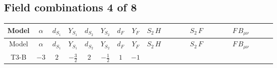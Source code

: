 \documentclass[8pt]{article}
\begin{document}
\begin{landscape}
\subsection*{Field combinations 4 of 8}
\begin{longtable}{@{}cccccccc >{\raggedright\arraybackslash}p{0.21\linewidth} >{\raggedright\arraybackslash}p{0.21\linewidth} >{\raggedright\arraybackslash}p{0.21\linewidth}@{}}
\toprule
Model & $\alpha$ & $d_{S_1}$ & $Y_{S_1}$ & $d_{S_2}$ & $Y_{S_2}$ & $d_F$ & $Y_F$ & $S_2\,H$ & $S_2\,F$ & $F\,B_{\mu\nu}$ \\
\midrule
\endfirsthead
\toprule
Model & $\alpha$ & $d_{S_1}$ & $Y_{S_1}$ & $d_{S_2}$ & $Y_{S_2}$ & $d_F$ & $Y_F$ & $S_2\,H$ & $S_2\,F$ & $F\,B_{\mu\nu}$ \\
\midrule
\endhead
T3-B & $-3$ & $2$ & $-\frac{3}{2}$ & $2$ & $-\frac{1}{2}$ & $1$ & $-1$ & \scriptsize\adjustbox{max width=\linewidth}{$\begin{gathered} -\frac{2 \hbar  \overline{y_{2,i_1,r_1}} \overline{Y_{e,i_2,i_3}} H_{a_2} S_{2,j_2} y_{2,i_2,r_1} Y_{e,i_1,i_3} \mathcal{I}_{y_2,a_1,j_1} {\mathcal{C}_{LS_2F}}^{*}_{a_2,j_2} H_{a_1}{}^{\dagger } S_{2,j_1}{}^{\dagger }}{\epsilon } \\ -2 \hbar  \overline{y_{2,i_1,r_1}} \overline{Y_{e,i_2,i_3}} H_{a_2} S_{2,j_2} y_{2,i_2,r_1} Y_{e,i_1,i_3} \mathcal{I}_{y_2,a_1,j_1} {\mathcal{C}_{LS_2F}}^{*}_{a_2,j_2} H_{a_1}{}^{\dagger } S_{2,j_1}{}^{\dagger } \\ +H_{a_2} S_{2,j_2} H_{a_1}{}^{\dagger } S_{2,j_1}{}^{\dagger } \mathcal{I}_{H2,a_1,a_2,j_1,j_2}{}^1 \lambda_{HS_2}^{(1)}^{(1)}\end{gathered}$} & \scriptsize\adjustbox{max width=\linewidth}{$\begin{gathered} +C_{S_2^\dagger S_2} \hbar  \log \left(\frac{\bar{\mu}^{2}}{M_F^2}\right) \overline{y_{2,i_1,r_1}} S_{2,j_1} y_{2,i_1,r_1} S_{2,j_1}{}^{\dagger } \\ -\hbar  \log \left(\frac{\bar{\mu}^{2}}{M_F^2}\right) \overline{y_{2,i_1,r_1}} \overline{y_{2,i_2,r_2}} S_{2,j_1} S_{2,j_2} y_{2,i_1,r_2} y_{2,i_2,r_1} S_{2,j_1}{}^{\dagger } S_{2,j_2}{}^{\dagger } \\ -\hbar  \log \left(\frac{\bar{\mu}^{2}}{M_F^2}\right) \overline{y_{2,i_1,r_1}} S_{2,j_3} S_{2,j_4} y_{2,i_1,r_1} S_{2,j_1}{}^{\dagger } S_{2,j_2}{}^{\dagger } \mathcal{I}_{S_2,j_1,j_3,j_2,j_4}{}^1 \lambda_{S_2}^{(1)}^{(1)}\end{gathered}$} & \scriptsize\adjustbox{max width=\linewidth}{$\begin{gathered} -\hbar  \log \left(\frac{\bar{\mu}^{2}}{M_F^2}\right) B_{\mu _1\mu _2}^2\end{gathered}$} \\

\end{longtable}
\end{landscape}
\end{document}
